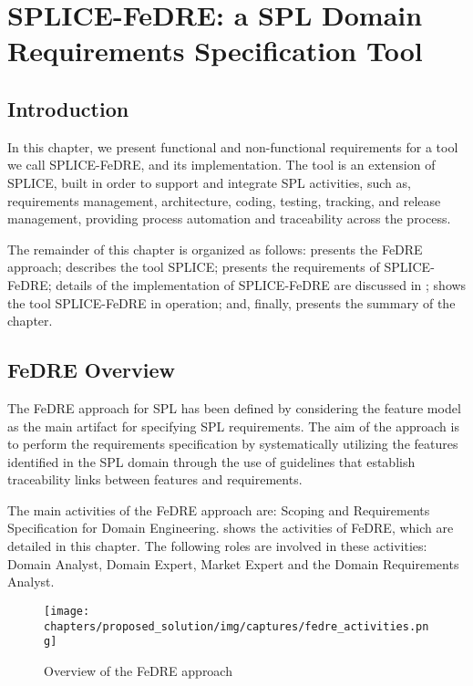 \chapter{SPLICE-FeDRE: a SPL Domain Requirements Specification Tool}
\label{ch:splice}

\section{Introduction}

In this chapter, we present functional and non-functional requirements for a tool we call SPLICE-FeDRE, 
and its implementation. The tool is an extension of \acf{SPLICE}, built in order
to support and integrate \ac{SPL} activities, such as, requirements management,
architecture, coding, testing, tracking, and release management, providing process automation and 
traceability across the process.

The remainder of this chapter is organized as follows: 
presents the \ac{FeDRE} approach;  describes the tool
\ac{SPLICE};  presents the requirements of SPLICE-FeDRE;
details of the implementation of SPLICE-FeDRE are discussed in
;  shows the tool SPLICE-FeDRE
in operation; and, finally,  presents the summary of
the chapter.
 
\section{FeDRE Overview}
\label{sc:fedre}

The \acf{FeDRE} approach \citep{de2014defining} for 
\ac{SPL} has been defined by considering the feature model as the main artifact for specifying \ac{SPL} requirements. 
The aim of the approach is to perform the requirements specification by systematically utilizing the features 
identified in the \ac{SPL} domain through the use of guidelines that establish traceability links between features 
and requirements.

The main activities of the \ac{FeDRE} approach are: Scoping and Requirements Specification for Domain Engineering. 
 shows the activities of \ac{FeDRE}, which are
detailed in this chapter. The following roles are involved in these activities: Domain Analyst, Domain Expert, Market Expert and the Domain Requirements Analyst.

\begin{figure}[htp]
\begin{center}
  \texttt{[image: chapters/proposed\_solution/img/captures/fedre\_activities.png]}
  \caption[Overview of the FeDRE approach]{Overview of the FeDRE approach \citep{de2014defining}}
  \label{fg:fedre-activities}
\end{center}
\end{figure}

